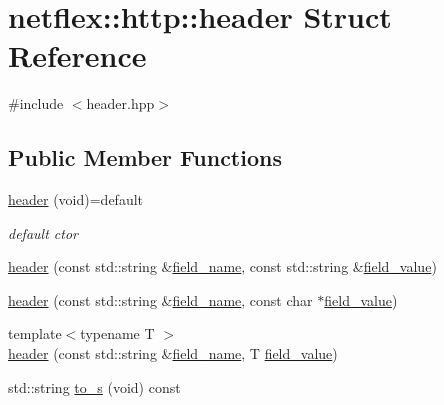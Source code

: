 \hypertarget{structnetflex_1_1http_1_1header}{}\section{netflex\+:\+:http\+:\+:header Struct Reference}
\label{structnetflex_1_1http_1_1header}


{\ttfamily \#include $<$header.\+hpp$>$}

\subsection*{Public Member Functions}
\begin{DoxyCompactItemize}
\item 
\mbox{\label{structnetflex_1_1http_1_1header_a7f3b5bc1ece0799aec49784a4be083b3}} 
\hyperlink{structnetflex_1_1http_1_1header_a7f3b5bc1ece0799aec49784a4be083b3}{header} (void)=default
\begin{DoxyCompactList}\small\item\em default ctor \end{DoxyCompactList}\item 
\hyperlink{structnetflex_1_1http_1_1header_a85972735c6bd2e9ae331aa939c5631a6}{header} (const std\+::string \&\hyperlink{structnetflex_1_1http_1_1header_ae72e56634fc6e2ec9ce4ff1bd633eaff}{field\+\_\+name}, const std\+::string \&\hyperlink{structnetflex_1_1http_1_1header_ab8ddd4c11c3775694f64976b5be29753}{field\+\_\+value})
\item 
\hyperlink{structnetflex_1_1http_1_1header_a5db781aa4a73145ec8054c8d7521be27}{header} (const std\+::string \&\hyperlink{structnetflex_1_1http_1_1header_ae72e56634fc6e2ec9ce4ff1bd633eaff}{field\+\_\+name}, const char $\ast$\hyperlink{structnetflex_1_1http_1_1header_ab8ddd4c11c3775694f64976b5be29753}{field\+\_\+value})
\item 
{\footnotesize template$<$typename T $>$ }\\\hyperlink{structnetflex_1_1http_1_1header_af5e35e57c8210a0927908f8e96598083}{header} (const std\+::string \&\hyperlink{structnetflex_1_1http_1_1header_ae72e56634fc6e2ec9ce4ff1bd633eaff}{field\+\_\+name}, T \hyperlink{structnetflex_1_1http_1_1header_ab8ddd4c11c3775694f64976b5be29753}{field\+\_\+value})
\item 
std\+::string \hyperlink{structnetflex_1_1http_1_1header_a6d9c1feb8881d1488b9b5793afc00579}{to\+\_\+s} (void) const
\end{DoxyCompactItemize}
